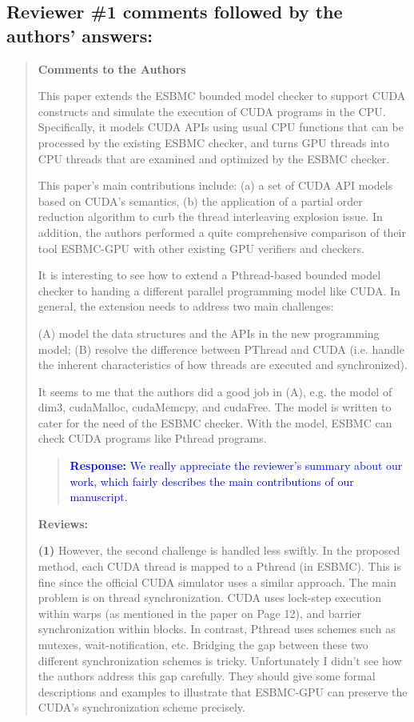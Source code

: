 \documentclass[11pt]{article}
\newcommand\vi{\vspace{\baselineskip}}
\begin{document}
\vi
\subsection*{Reviewer \#1 comments followed by the authors' answers:}

\begin{quote}

{\bf Comments to the Authors}

This paper extends the ESBMC bounded model checker to support CUDA constructs and simulate the execution of CUDA programs in the CPU. Specifically, it models CUDA APIs using usual CPU functions that can be processed by the existing ESBMC checker, and turns GPU threads into CPU threads that are examined and optimized by the ESBMC checker.

This paper's main contributions include: (a) a set of CUDA API models based on CUDA's semantics, (b) the application of a partial order reduction algorithm to curb the thread interleaving explosion issue. In addition, the authors performed a quite comprehensive comparison of their tool ESBMC-GPU with other existing GPU verifiers and checkers.

It is interesting to see how to extend a Pthread-based bounded model checker to handing a different parallel programming model like CUDA. In general, the extension needs to address two main challenges:

  (A) model the data structures and the APIs in the new programming model;
  (B) resolve the difference between PThread and CUDA (i.e. handle the inherent characteristics of how threads are executed and synchronized).

It seems to me that the authors did a good job in (A), e.g. the model of dim3, cudaMalloc, cudaMemcpy, and cudaFree. The model is written to cater for the need of the ESBMC checker. With the model, ESBMC can check CUDA programs like Pthread programs.

\begin{quote}
\textcolor{blue}{\textbf{Response:} We really appreciate the reviewer's summary about our work, which fairly describes the main contributions of our manuscript.}
\end{quote}

{\bf Reviews:}

{\bf (1)} However, the second challenge is handled less swiftly. In the proposed method, each CUDA thread is mapped to a Pthread (in ESBMC). This is fine since the official CUDA simulator uses a similar approach. The main problem is on thread synchronization. CUDA uses lock-step execution within warps (as mentioned in the paper on Page 12), and barrier synchronization within blocks. In contrast, Pthread uses schemes such as mutexes, wait-notification, etc. Bridging the gap between these two different synchronization schemes is tricky. Unfortunately I didn't see how the authors address this gap carefully. They should give some formal descriptions and examples to illustrate that ESBMC-GPU can preserve the CUDA's synchronization scheme precisely.


\end{quote}
\end{document}
